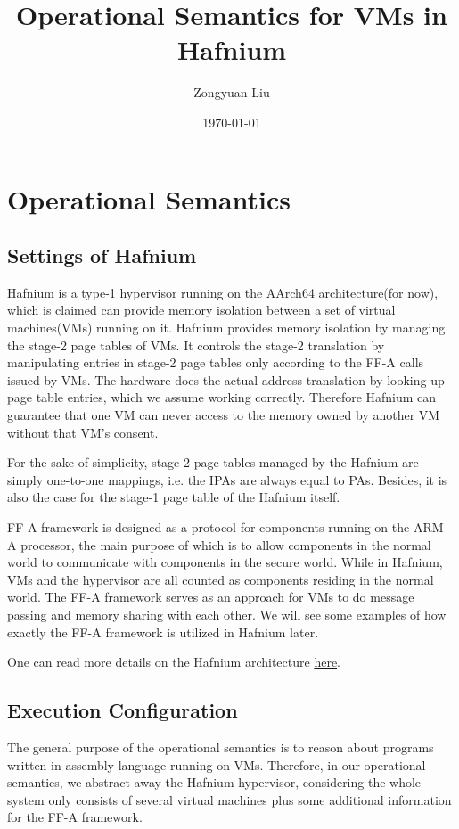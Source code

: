\documentclass[a4paper]{article}
\title{Operational Semantics %
  for VMs in Hafnium} \date{\today}
\author{Zongyuan Liu}
\begin{document}
\maketitle

\section{Operational Semantics}

\subsection{Settings of Hafnium}
Hafnium is a type-1 hypervisor running on the AArch64 architecture(for now),
which is claimed can provide memory isolation between a set of virtual
machines(VMs) running on it. Hafnium provides memory isolation by managing the
stage-2 page tables of VMs. It controls the stage-2 translation by manipulating
entries in stage-2 page tables only according to the FF-A calls issued by VMs.
The hardware does the actual address translation by looking up page table
entries, which we assume working correctly. Therefore Hafnium can
guarantee that one VM can never access to the memory owned by another VM without
that VM's consent.

For the sake of simplicity, stage-2 page tables managed by the Hafnium are
simply one-to-one mappings, i.e. the IPAs are always equal to PAs. Besides, it
is also the case for the stage-1 page table of the Hafnium itself.

FF-A framework is designed as a protocol for components running on the ARM-A
processor, the main purpose of which is to allow components in the normal world
to communicate with components in the secure world. While in Hafnium, VMs and
the hypervisor are all counted as components residing in the normal world. The
FF-A framework serves as an approach for VMs to do message passing and
memory sharing with each other. We will see some examples of how exactly the
FF-A framework is utilized in Hafnium later.

One can read more details on the Hafnium architecture
\href{https://review.trustedfirmware.org/plugins/gitiles/hafnium/hafnium/+/HEAD/docs/Architecture.md}{here}.

\subsection{Execution Configuration}
 The general purpose of the operational
semantics is to reason about programs written in assembly language running on
VMs. Therefore, in our operational semantics, we abstract away the Hafnium
hypervisor, considering the whole system only consists of several virtual
machines plus some additional information for the FF-A framework.
\end{document}
